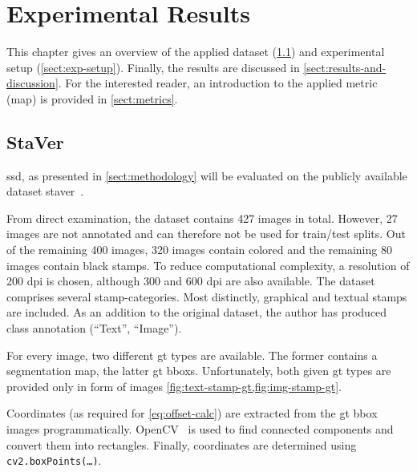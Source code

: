 \section{Experimental Results}
This chapter gives an overview of the applied dataset (\cref{sect:staver})
and experimental setup (\cref{sect:exp-setup}). Finally, the results are discussed
in \cref{sect:results-and-discussion}. For the interested reader, an introduction
to the applied metric (\gls{map}) is provided in \cref{sect:metrics}.

\subsection{StaVer}\label{sect:staver}
\Gls{ssd}, as presented in \cref{sect:methodology} will be evaluated on the publicly
available dataset \gls{staver}\footnotemark~\cite{Micenkova.2015}.

From direct examination, the dataset contains 427 images in total. However,
27 images are not annotated and can therefore not be used for train/test splits.
Out of the remaining 400 images, 320 images contain colored and the remaining
80 images contain black stamps.  To reduce computational complexity, a resolution
of 200 dpi is chosen, although 300 and 600 dpi are also available. The dataset
comprises several stamp-categories. Most distinctly, graphical and textual stamps
are included. As an addition to the original dataset, the author has produced
class annotation (``Text'', ``Image'').

For every image, two different \gls{gt} types are available. The former contains
a segmentation map, the latter \gls{gt} \glspl{bbox}. Unfortunately, both given \gls{gt}
types are provided only in form of images \cref{fig:text-stamp-gt,fig:img-stamp-gt}.

Coordinates (as required for \cref{eq:offset-calc}) are extracted from the \gls{gt}
\gls{bbox} images programmatically. OpenCV~\cite{Bradski.2000} is used to find
connected components and convert them into rectangles. Finally, coordinates are
determined using \texttt{cv2.boxPoints(\ldots)}.

